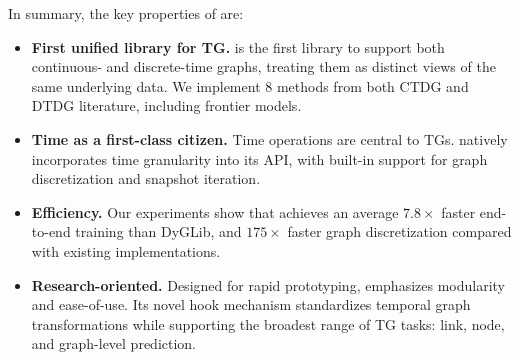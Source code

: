 In summary, the key properties of \name are:
\begin{itemize}[leftmargin=*, noitemsep, topsep=0.2pt]
    \item \textbf{First unified library for TG.} \name is the first library to support both continuous- and discrete-time graphs, treating them as distinct views of the same underlying data. We implement 8 methods from both CTDG and DTDG literature, including frontier models.

    \item \textbf{Time as a first-class citizen.} Time operations are central to TGs. \name natively incorporates time granularity into its API, with built-in support for graph discretization and snapshot iteration.

    \item \textbf{Efficiency.} Our experiments show that \name achieves an average $7.8\times$ faster end-to-end training than DyGLib, and $175\times$ faster graph discretization compared with existing implementations.

    \item \textbf{Research-oriented.}  Designed for rapid prototyping, \name emphasizes modularity and ease-of-use. Its novel hook mechanism standardizes temporal graph transformations while supporting the broadest range of TG tasks: link, node, and graph-level prediction. 
\end{itemize}

